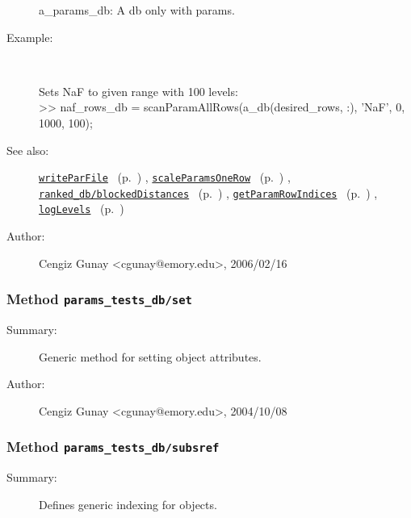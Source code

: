 \begin{description}
	a\_params\_db: A db only with params.
%
\item[Example:]~
\begin{lyxcode} Sets NaF to given range with 100 levels:
\\%
 >> naf\_rows\_db = scanParamAllRows(a\_db(desired\_rows, :), 'NaF', 0, 1000, 100);
\\%
\end{lyxcode}
%
\item[See also:]%
\hyperlink{ref_writeParFile}{\texttt{writeParFile}}%
\ (p.~\pageref{ref_writeParFile})%
%
, \hyperlink{ref_scaleParamsOneRow}{\texttt{scaleParamsOneRow}}%
\ (p.~\pageref{ref_scaleParamsOneRow})%
%
, \hyperlink{ref_ranked_db__blockedDistances}{\texttt{ranked\_db/blockedDistances}}%
\ (p.~\pageref{ref_ranked_db__blockedDistances})%
%
, \hyperlink{ref_getParamRowIndices}{\texttt{getParamRowIndices}}%
\ (p.~\pageref{ref_getParamRowIndices})%
%
, \hyperlink{ref_logLevels}{\texttt{logLevels}}%
\ (p.~\pageref{ref_logLevels})%
%
%
\item[Author:]%
Cengiz Gunay <cgunay@emory.edu>, 2006/02/16
%
\end{description}
\methodline%
\subsubsection[Method \texttt{set}]{Method \texttt{params\_tests\_db/set}}%
%
\label{ref_params_tests_db__set}%
\hypertarget{ref_params_tests_db__set}{}%
\begin{description}
\item[Summary:]Generic method for setting object attributes.
%
%
%
%
%
%
%
\item[Author:]%
Cengiz Gunay <cgunay@emory.edu>, 2004/10/08
%
\end{description}
\methodline%
\subsubsection[Method \texttt{subsref}]{Method \texttt{params\_tests\_db/subsref}}%
%
\label{ref_params_tests_db__subsref}%
\hypertarget{ref_params_tests_db__subsref}{}%
\begin{description}
\item[Summary:]Defines generic indexing for objects.
%
%
%
%
%
%
%
%
\end{description}
\methodline%
